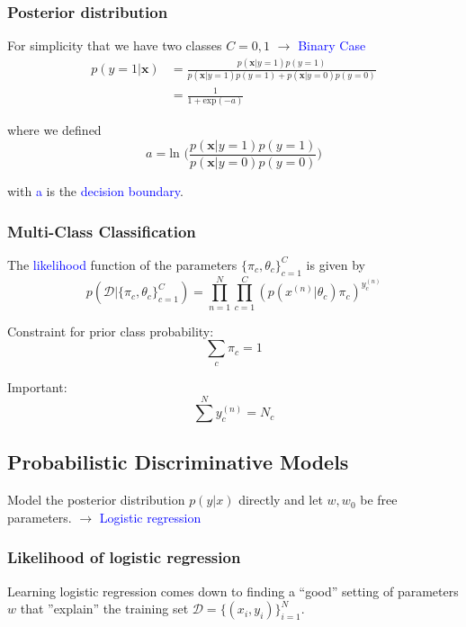 \documentclass[a4paper,10pt,twoside=true,DIV=10,headsepline,plainheadsepline]{scrartcl}
\begin{document}
		\subsubsection{Posterior distribution}
		For simplicity that we have two classes $C = {0, 1}$ $\rightarrow$ \textcolor{blue}{Binary Case}
		\begin{align}
			p(y=1|\mathbf{x}) &= \frac{p ( \mathbf{x} | y = 1)p(y=1)}{p ( \mathbf{x} | y = 1)p(y=1) + p ( \mathbf{x} | y = 0)p(y=0)} \\
			&= \frac{1}{1 + \textrm{exp}(-a)}
		\end{align}

		where we defined
		\begin{equation}
			a = \textrm{ln } \Bigg( \frac{p ( \mathbf{x} | y = 1)p(y=1)}{p ( \mathbf{x} | y = 0)p(y=0)} \Bigg)
		\end{equation}

		with \textcolor{blue}{a} is the \textcolor{blue}{decision boundary}.

			\subsubsection{Multi-Class Classification}
				The \textcolor{blue}{likelihood} function of the parameters $ \{\pi_c, \theta_c \}_{c=1}^C $ is given by
				\begin{equation}
					p(\mathcal{D} | \{\pi_c, \theta_c \}_{c=1}^C ) = \prod_{n=1}^N  \prod_{c=1}^C (p(x^{(n)} | \theta_c ) \pi_c )^{y_c^{(n)}}
				\end{equation}

				Constraint for prior class probability:
					\begin{equation}
						\sum_c \pi_c = 1
					\end{equation} 

				Important:
					\begin{equation}
						\sum^N y_{c}^{(n)} = N_c
					\end{equation} 

		\subsection{Probabilistic Discriminative Models}
			Model the posterior distribution $p(y | x)$ directly and let $w, w_0$ be free parameters. $\rightarrow$ \textcolor{blue}{Logistic regression}


		\subsubsection{Likelihood of logistic regression}
			Learning logistic regression comes down to finding a “good” setting of parameters $w$ that ”explain” the training set $\mathcal{D} = \{(x_i , y_i)\}^N_{i=1}$.
			\newline
\end{document}
